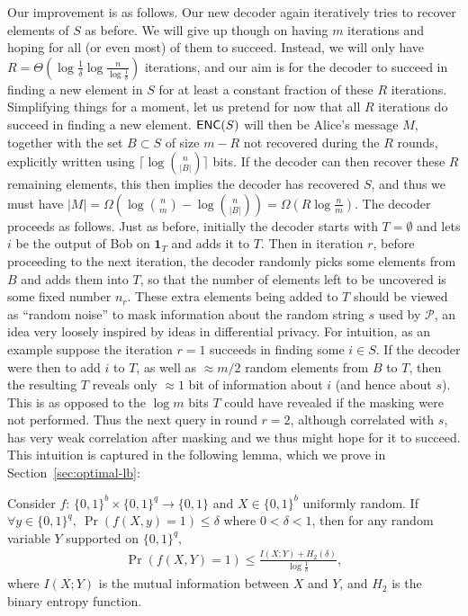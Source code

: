 Our improvement is as follows. Our new decoder again iteratively tries to recover elements of $S$ as before. We will give up though on having $m$ iterations and hoping for all (or even most) of them to succeed. Instead, we will only have $R = \Theta(\log \frac 1{\delta}\log \frac n{\log \frac 1{\delta}})$ iterations, and our aim is for the decoder to succeed in finding a new element in $S$ for at least a constant fraction of these $R$ iterations. Simplifying things for a moment, let us pretend for now that all $R$ iterations do succeed in finding a new element. $\textsf{ENC}(S)$ will then be Alice's message $M$, together with the set $B\subset S$ of size $m-R$ not recovered during the $R$ rounds, explicitly written using $\lceil\log{n \choose |B|}\rceil$ bits. If the decoder can then recover these $R$ remaining elements, this then implies the decoder has recovered $S$, and thus we must have $|M| = \Omega(\log{n\choose m} - \log{n \choose |B|}) = \Omega(R\log \frac nm)$. The decoder proceeds as follows. Just as before, initially the decoder starts with $T = \emptyset$ and lets $i$ be the output of Bob on $\mathbf{1}_T$ and adds it to $T$. Then in iteration $r$, before proceeding to the next iteration, the decoder randomly picks some elements from $B$ and adds them into $T$, so that the number of elements left to be uncovered is some fixed number $n_r$. These extra elements being added to $T$ should be viewed as ``random noise'' to mask information about the random string $s$ used by $\mathcal{P}$, an idea very loosely inspired by ideas in differential privacy. For intuition, as an example suppose the iteration $r=1$ succeeds in finding some $i\in S$. If the decoder were then to add $i$ to $T$, as well as $\approx m/2$ random elements from $B$ to $T$, then the resulting $T$ reveals only $\approx 1$ bit of information about $i$ (and hence about $s$). This is as opposed to the $\log m$ bits $T$ could have revealed if the masking were not performed. Thus the next query in round $r=2$, although correlated with $s$, has very weak correlation after masking and we thus might hope for it to succeed. This intuition is captured in the following lemma, which we prove in Section~\ref{sec:optimal-lb}:
\begin{lemma}\label{lem:information}
  Consider $f$: $\{0,1\}^b\times \{0,1\}^q\rightarrow \{0,1\}$ and $X\in\{0,1\}^b$ uniformly random. If $\forall y\in \{0,1\}^q,\ \Pr(f(X,y)=1)\le \delta$ where $0<\delta<1$, then for any random variable $Y$ supported on $\{0,1\}^q$,
  \begin{align}
    \Pr(f(X,Y)=1)\le \frac{I(X;Y)+H_2(\delta)}{\log \frac{1}{\delta}}, \label{eqn:adaptivity}
  \end{align}
  where $I(X;Y)$ is the mutual information between $X$ and $Y$, and $H_2$ is the binary entropy function.
\end{lemma}
